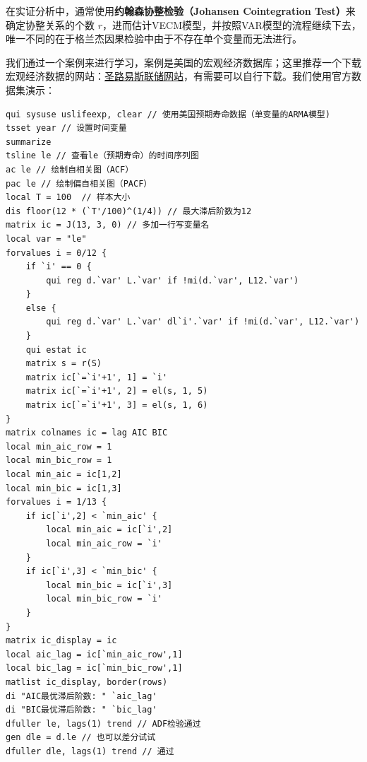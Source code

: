 在实证分析中，通常使用\textbf{约翰森协整检验（Johansen Cointegration Test）}来确定协整关系的个数 $r$，进而估计VECM模型，并按照VAR模型的流程继续下去，唯一不同的在于格兰杰因果检验中由于不存在单个变量而无法进行。

我们通过一个案例来进行学习，案例是美国的宏观经济数据库；这里推荐一个下载宏观经济数据的网站：\href{https://fred.stlouisfed.org/}{圣路易斯联储网站}，有需要可以自行下载。我们使用官方数据集演示：

\begin{tcolorbox}[title=在 Stata 中应用单变量时间序列分析, colback=white, colframe=black, colbacktitle=white, coltitle=black,fonttitle=\bfseries]
\begin{lstlisting}[xleftmargin=2em, commentstyle=\color{black}]
qui sysuse uslifeexp, clear // 使用美国预期寿命数据（单变量的ARMA模型)
tsset year // 设置时间变量
summarize
tsline le // 查看le（预期寿命）的时间序列图
ac le // 绘制自相关图（ACF）
pac le // 绘制偏自相关图（PACF）
local T = 100  // 样本大小
dis floor(12 * (`T'/100)^(1/4)) // 最大滞后阶数为12
matrix ic = J(13, 3, 0) // 多加一行写变量名
local var = "le"
forvalues i = 0/12 {
    if `i' == 0 {
        qui reg d.`var' L.`var' if !mi(d.`var', L12.`var')
    }
    else {
        qui reg d.`var' L.`var' dl`i'.`var' if !mi(d.`var', L12.`var')
    }
    qui estat ic
    matrix s = r(S)
    matrix ic[`=`i'+1', 1] = `i'
    matrix ic[`=`i'+1', 2] = el(s, 1, 5)
    matrix ic[`=`i'+1', 3] = el(s, 1, 6)
}
matrix colnames ic = lag AIC BIC
local min_aic_row = 1
local min_bic_row = 1
local min_aic = ic[1,2]
local min_bic = ic[1,3]
forvalues i = 1/13 {
    if ic[`i',2] < `min_aic' {
        local min_aic = ic[`i',2]
        local min_aic_row = `i'
    }
    if ic[`i',3] < `min_bic' {
        local min_bic = ic[`i',3]
        local min_bic_row = `i'
    }
}
matrix ic_display = ic
local aic_lag = ic[`min_aic_row',1]
local bic_lag = ic[`min_bic_row',1]
matlist ic_display, border(rows)
di "AIC最优滞后阶数: " `aic_lag'
di "BIC最优滞后阶数: " `bic_lag'
dfuller le, lags(1) trend // ADF检验通过
gen dle = d.le // 也可以差分试试
dfuller dle, lags(1) trend // 通过
\end{lstlisting}
\end{tcolorbox}

